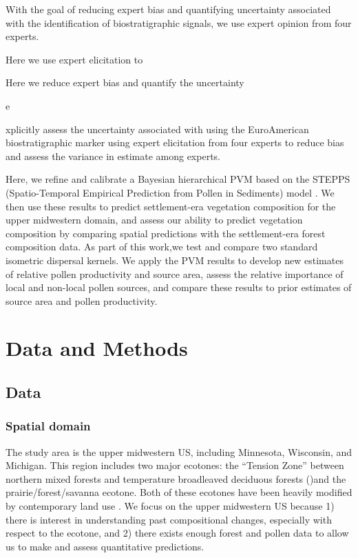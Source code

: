 \documentclass[12pt]{article}
\begin{document}
With the goal of reducing expert bias and
quantifying uncertainty associated with the identification of
biostratigraphic signals, we use expert opinion from four experts.

Here we use expert elicitation to 

Here we reduce
expert bias and quantify the uncertainty

e

xplicitly
assess the uncertainty associated with using the EuroAmerican
biostratigraphic marker using expert elicitation from four experts to
reduce bias and assess the variance in estimate among experts.

Here, we refine and calibrate a Bayesian hierarchical PVM based on the
STEPPS (Spatio-Temporal Empirical Prediction from Pollen in Sediments)
model \citep{paciorek2009mapping}. We then use these
results to predict settlement-era vegetation composition for the upper
midwestern domain, and assess our ability to predict vegetation
composition by comparing spatial predictions with the settlement-era
forest composition data. As part of this work,we test and compare two
standard isometric dispersal kernels. We apply the PVM results to
develop new estimates of relative pollen productivity and source area,
assess the relative importance of local and non-local pollen sources,
and compare these results to prior estimates of source area and pollen
productivity.

\section{Data and Methods}

\subsection{Data}

\subsubsection{Spatial domain}

The study area is the upper midwestern US, including Minnesota,
Wisconsin, and Michigan.  This region includes two major ecotones: the
``Tension Zone'' between northern mixed forests and temperature
broadleaved deciduous forests (\citet{curtis1959vegetation})and the
prairie/forest/savanna ecotone.  Both of these ecotones have been
heavily modified by contemporary land use \citep{goring_witness}. We
focus on the upper midwestern US because 1) there is interest in
understanding past compositional changes, especially with respect to
the ecotone, and 2) there exists enough forest and pollen data to
allow us to make and assess quantitative predictions.
\end{document}
